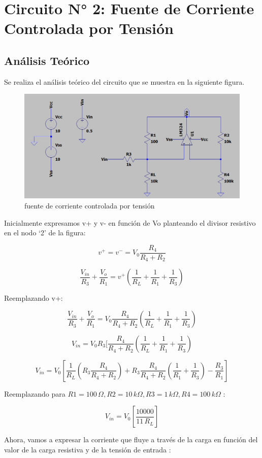 \section{Circuito N° 2: Fuente de Corriente Controlada por Tensión}

\subsection{Análisis Teórico}

Se realiza el análisis teórico del circuito que se muestra en la siguiente figura. 


\begin{figure}[H]
    \centering
    \includegraphics[width=0.7\linewidth]{Circuito2.jpg}
    \caption{fuente de corriente controlada por tensión}
\end{figure}

Inicialmente expresamos v+ y v- en función de Vo planteando el divisor resistivo en el nodo ‘2’ de la figura:

\[v^+ = v^- = V_0  \frac{R_4}{R_4 + R_2} \]

\[\frac{V_{in}}{R_3} + \frac{V_o}{R_1} = v^+ (\frac{1}{R_L}+\frac{1}{R_1}+\frac{1}{R_3}) \]

Reemplazando v+:

\[\frac{V_{in}}{R_3} + \frac{V_o}{R_1} = V_0  \frac{R_4}{R_4 + R_2} (\frac{1}{R_L}+\frac{1}{R_1}+\frac{1}{R_3})\]

\[{V_{in}} = V_0  R_3 [ \frac{R_4}{R_4 + R_2} (\frac{1}{R_L}+\frac{1}{R_1}+\frac{1}{R_3})\]

\[{V_{in}} = V_0 \left[ \frac{1}{R_L}(R_3 \frac{R_4}{R_4 + R_2}) + R_3\frac{R_4}{R_4 + R_2}(\frac{1}{R_1}+\frac{1}{R_3})-\frac{R_3}{R_1} \right] \]

Reemplazando para $ R1 = 100\,\Omega, R2 = 10\,k\Omega, R3 = 1\,k\Omega, R4 = 100\,k\Omega $ :

\[{V_{in}} = V_0 \left[ \frac{10000}{11\,R_L} \right]\]

Ahora, vamos a expresar la corriente que fluye a través de la carga en
función del valor de la carga resistiva y de la tensión de entrada :


